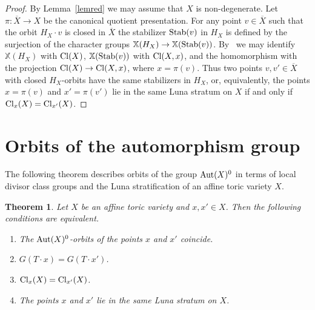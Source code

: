 \documentclass[12pt,a4paper]{amsart}
\theoremstyle{plain}
\newtheorem{theorem}{Theorem}
\theoremstyle{definition}
\begin{document}
\begin{proof}
By Lemma~\ref{lemred} we may assume that $X$ is non-degenerate.
Let $\pi:\overline{X} \to X$ be the canonical quotient presentation.
For any point $v\in\overline{X}$ such that the orbit $H_X\cdot v$ is closed in $\overline{X}$
the stabilizer ${\mathop{\rm Stab}}(v)$ in $H_X$ is defined by the surjection of the character groups
${{\mathbb X}}(H_X) \to {{\mathbb X}}({\mathop{\rm Stab}}(v))$. By~\cite[Proposition~6.2.2]{ADHL} we may identify
${{\mathbb X}}(H_X)$ with ${\mathop{\rm Cl}}(X)$, ${{\mathbb X}}({\mathop{\rm Stab}}(v))$ with ${\mathop{\rm Cl}}(X,x)$, and the homomorphism
with the projection ${\mathop{\rm Cl}}(X)\to{\mathop{\rm Cl}}(X,x)$, where $x=\pi(v)$.
Thus two points $v,v'\in \overline{X}$
with closed $H_X$-orbits have the same stabilizers in $H_X$, or, equivalently,
the points $x=\pi(v)$ and $x'=\pi(v')$ lie in the same Luna stratum on $X$ if and only if
${\mathop{\rm Cl}}_x(X)={\mathop{\rm Cl}}_{x'}(X)$.
\end{proof}

\section{Orbits of the automorphism group}
\label{sec5}

The following theorem describes orbits of the group
${\mathop{\rm Aut}}(X)^0$ in terms of local divisor class groups and the Luna stratification
of an affine toric variety $X$.

\begin{theorem} \label{tmain}
Let $X$ be an affine toric variety and $x,x'\in X$. Then
the following conditions are equivalent.
\begin{enumerate}
\item
The ${\mathop{\rm Aut}}(X)^0$-orbits of the points $x$ and $x'$ coincide.
\smallskip
\item
$G(T\cdot x) =G(T\cdot x')$.
\smallskip
\item
${\mathop{\rm Cl}}_x(X)={\mathop{\rm Cl}}_{x'}(X)$.
\smallskip
\item
The points $x$ and $x'$ lie in the same Luna stratum on $X$.
\end{enumerate}
\end{theorem}
\end{document}
